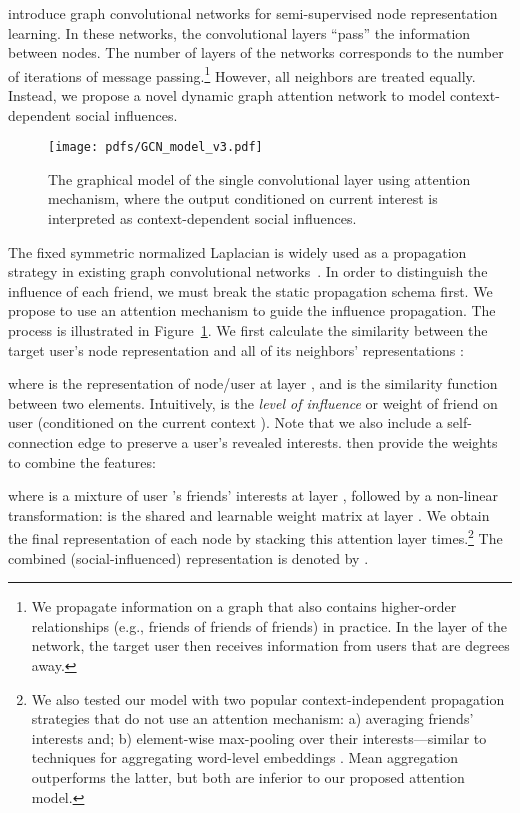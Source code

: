 \documentclass[sigconf]{acmart}
\begin{document}
\citet{kipf2016semi} introduce graph convolutional networks for semi-supervised node representation learning. In these networks, the convolutional layers ``pass'' the information between nodes. The number of layers  of the networks corresponds to the number of iterations of message passing.\footnote{We propagate information on a graph that also contains higher-order relationships (e.g., friends of friends of friends) in practice. In the  layer of the network, the target user then receives information from users that are  degrees away.}
However, all neighbors are treated equally.
Instead, we propose a novel dynamic graph attention network to model context-dependent social influences.



\begin{figure}
\centering
\texttt{[image: pdfs/GCN\_model\_v3.pdf]}
\caption{The graphical model of the single convolutional layer using attention mechanism, where the output conditioned on current interest is interpreted as context-dependent social influences.}
\label{fig:attention_module}
\end{figure}

The fixed symmetric normalized Laplacian
is widely used as a propagation strategy in existing graph convolutional networks~\cite{defferrard2016convolutional,kipf2016semi}. In order to distinguish the influence of each friend, we must break the static propagation schema first.
We propose to use an attention mechanism to guide the influence propagation. The process is illustrated in Figure~\ref{fig:attention_module}. We first calculate the similarity between the target user's node representation  and all of its neighbors' representations :

where  is the representation of node/user  at layer , and  is the similarity function between two elements. Intuitively,  is the \emph{level of influence} or weight of friend 
on user  (conditioned on the current context ). Note that we also include a self-connection edge to preserve a user's revealed interests. 
 then provide the weights to combine the features:

where  is a mixture of user 's friends' interests at layer , followed by a non-linear transformation:
  is the shared and learnable weight matrix at layer . We obtain the final representation of each node by stacking this attention layer  times.\footnote{We also tested our model with two popular context-independent propagation strategies that do not use an attention mechanism: a) averaging friends' interests and; b) element-wise max-pooling over their interests---similar to techniques for aggregating word-level embeddings \cite{weston2014tagspace}. Mean aggregation outperforms the latter, but both are inferior to our proposed attention model.} The combined (social-influenced) representation is denoted by .
\end{document}
